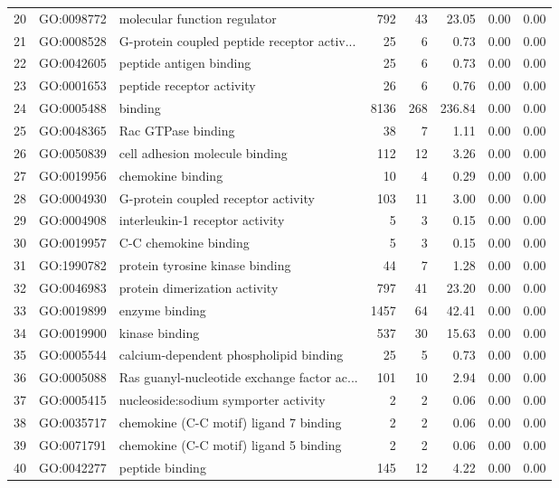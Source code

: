 \begin{table}[ht]
\begin{tabular}{rllrrrrr}
  20 & GO:0098772 & molecular function regulator & 792 &  43 & 23.05 & 0.00 & 0.00 \\ 
  21 & GO:0008528 & G-protein coupled peptide receptor activ... &  25 &   6 & 0.73 & 0.00 & 0.00 \\ 
  22 & GO:0042605 & peptide antigen binding &  25 &   6 & 0.73 & 0.00 & 0.00 \\ 
  23 & GO:0001653 & peptide receptor activity &  26 &   6 & 0.76 & 0.00 & 0.00 \\ 
  24 & GO:0005488 & binding & 8136 & 268 & 236.84 & 0.00 & 0.00 \\ 
  25 & GO:0048365 & Rac GTPase binding &  38 &   7 & 1.11 & 0.00 & 0.00 \\ 
  26 & GO:0050839 & cell adhesion molecule binding & 112 &  12 & 3.26 & 0.00 & 0.00 \\ 
  27 & GO:0019956 & chemokine binding &  10 &   4 & 0.29 & 0.00 & 0.00 \\ 
  28 & GO:0004930 & G-protein coupled receptor activity & 103 &  11 & 3.00 & 0.00 & 0.00 \\ 
  29 & GO:0004908 & interleukin-1 receptor activity &   5 &   3 & 0.15 & 0.00 & 0.00 \\ 
  30 & GO:0019957 & C-C chemokine binding &   5 &   3 & 0.15 & 0.00 & 0.00 \\ 
  31 & GO:1990782 & protein tyrosine kinase binding &  44 &   7 & 1.28 & 0.00 & 0.00 \\ 
  32 & GO:0046983 & protein dimerization activity & 797 &  41 & 23.20 & 0.00 & 0.00 \\ 
  33 & GO:0019899 & enzyme binding & 1457 &  64 & 42.41 & 0.00 & 0.00 \\ 
  34 & GO:0019900 & kinase binding & 537 &  30 & 15.63 & 0.00 & 0.00 \\ 
  35 & GO:0005544 & calcium-dependent phospholipid binding &  25 &   5 & 0.73 & 0.00 & 0.00 \\ 
  36 & GO:0005088 & Ras guanyl-nucleotide exchange factor ac... & 101 &  10 & 2.94 & 0.00 & 0.00 \\ 
  37 & GO:0005415 & nucleoside:sodium symporter activity &   2 &   2 & 0.06 & 0.00 & 0.00 \\ 
  38 & GO:0035717 & chemokine (C-C motif) ligand 7 binding &   2 &   2 & 0.06 & 0.00 & 0.00 \\ 
  39 & GO:0071791 & chemokine (C-C motif) ligand 5 binding &   2 &   2 & 0.06 & 0.00 & 0.00 \\ 
  40 & GO:0042277 & peptide binding & 145 &  12 & 4.22 & 0.00 & 0.00 \\ 

\end{tabular}
\end{table}
